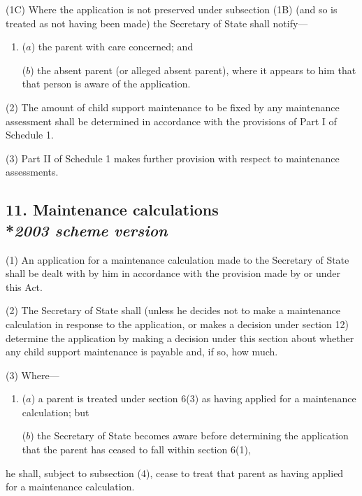 \documentclass[12pt,a4paper]{article}
\begin{document}
(1C) Where the application is not preserved under subsection (1B) (and so is treated as not having been made) the Secretary of State shall notify—
\begin{enumerate}\item[]
($a$) the parent with care concerned; and

($b$) the absent parent (or alleged absent parent), where it appears to him that that person is aware of the application.
\end{enumerate}

(2) The amount of child support maintenance to be fixed by any maintenance assessment shall be determined in accordance with the provisions of Part I of Schedule 1.

(3) Part II of Schedule 1 makes further provision with respect to maintenance assessments.


\subsection[11. Maintenance calculations --- \emph{2003 scheme version}]{11. Maintenance calculations\\*\emph{2003 scheme version}}

(1) An application for a maintenance calculation made to the Secretary of State shall be dealt with by him in accordance with the provision made by or under this Act.

(2) The Secretary of State shall (unless he decides not to make a maintenance calculation in response to the application, or makes a decision under section 12) determine the application by making a decision under this section about whether any child support maintenance is payable and, if so, how much.

(3) Where—
\begin{enumerate}\item[]
($a$) a parent is treated under section 6(3)  as having applied for a maintenance calculation; but

($b$) the Secretary of State becomes aware before determining the application that the parent has ceased to fall within section 6(1),
\end{enumerate}
he shall, subject to subsection (4), cease to treat that parent as having applied for a maintenance calculation.
\end{document}
